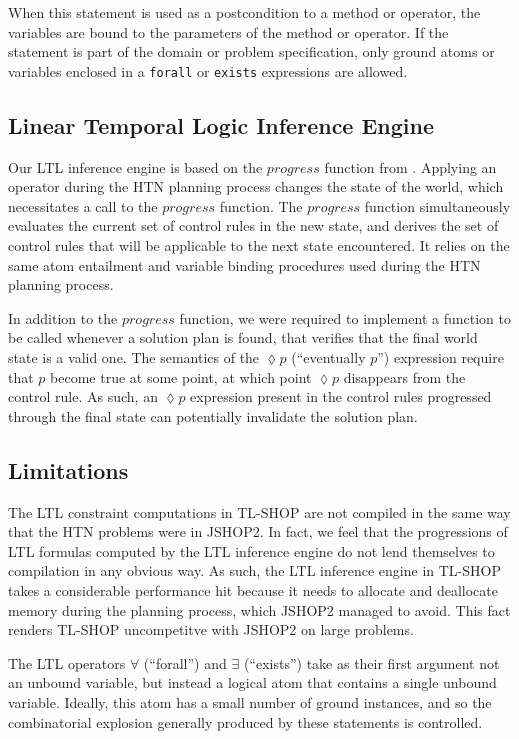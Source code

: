 \documentclass[12pt]{article}
\begin{document}
When this statement is used as a postcondition to a method or operator, the 
variables are bound to the parameters of the method or operator. If the 
statement is part of the domain or problem specification, only ground atoms or 
variables enclosed in a \texttt{forall} or \texttt{exists} expressions are 
allowed.

\subsection{Linear Temporal Logic Inference Engine}
Our LTL inference engine is based on the $progress$ function from 
\cite{nau2004apt}. Applying an operator during the HTN planning process changes 
the state of the world, which necessitates a call to the $progress$ function. 
The $progress$ function simultaneously evaluates the current set of control 
rules in the new state, and derives the set of control rules that will be 
applicable to the next state encountered. It relies on the same atom entailment 
and variable binding procedures used during the HTN planning process.

In addition to the $progress$ function, we were required to implement a 
function to be called whenever a solution plan is found, that verifies that the 
final world state is a valid one. The semantics of the $\lozenge p$ 
(``eventually $p$'') expression require that $p$ become true at some point, at 
which point $\lozenge p$ disappears from the control rule. As such, an 
$\lozenge p$ expression present in the control rules progressed through the 
final state can potentially invalidate the solution plan.

\subsection{Limitations} 
The LTL constraint computations in TL-SHOP are not compiled in the same way 
that the HTN problems were in JSHOP2. In fact, we feel that the progressions of 
LTL formulas computed by the LTL inference engine do not lend themselves to 
compilation in any obvious way. As such, the LTL inference engine in TL-SHOP 
takes a considerable performance hit because it needs to allocate and 
deallocate memory during the planning process, which JSHOP2 managed to avoid. 
This fact renders TL-SHOP uncompetitve with JSHOP2 on large problems.

The LTL operators $\forall$ (``forall'') and $\exists$ (``exists'') take as 
their first argument not an unbound variable, but instead a logical atom that 
contains a single unbound variable. Ideally, this atom has a small number of 
ground instances, and so the combinatorial explosion generally produced by 
these statements is controlled.
\end{document}
